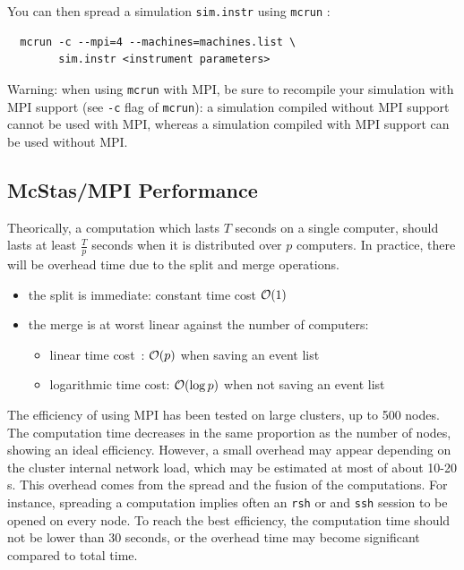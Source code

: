 You can then spread a simulation \verb'sim.instr' using \verb'mcrun' :
\begin{lstlisting}
  mcrun -c --mpi=4 --machines=machines.list \
        sim.instr <instrument parameters>
\end{lstlisting}

\begin{paragraph}{Warning:} when using \verb'mcrun' with MPI, be sure
  to recompile your simulation with MPI support (see \verb'-c' flag of
  \verb'mcrun'): a simulation compiled without MPI support cannot be
  used with MPI, whereas a simulation compiled with MPI support can be
  used without MPI.
\end{paragraph}

\subsection{McStas/MPI Performance}

Theorically, a computation which lasts $T$ seconds on a single computer,
should lasts at least $\frac{T}{p}$ seconds when it is distributed
over $p$ computers. In practice, there will be overhead time due to the split
and merge operations.
\begin{itemize}
\item the split is immediate: constant time cost ${\cal O}(1)$
\item the merge is at worst linear against the number of computers:
  \begin{itemize}
  \item linear time cost~: ${\cal O}(p)$ when saving an event list
  \item logarithmic time cost: ${\cal O}(\log{p})$ when not saving an
  event list
  \end{itemize}
\end{itemize}

The efficiency of \MCS using MPI has been tested on large clusters, up to 500 nodes.
The computation time decreases in the same proportion as the number of nodes, 
showing an ideal efficiency. However, a small overhead may appear depending on the cluster 
internal network load, which may be estimated at most of about 10-20 s. 
This overhead comes from the spread and the
fusion of the computations. For instance, spreading a computation
implies often an \verb'rsh' or and \verb'ssh' session to be opened on
every node.
To reach the best efficiency, the computation time should not be lower than 30 seconds,
or the overhead time may become significant compared to total time.

